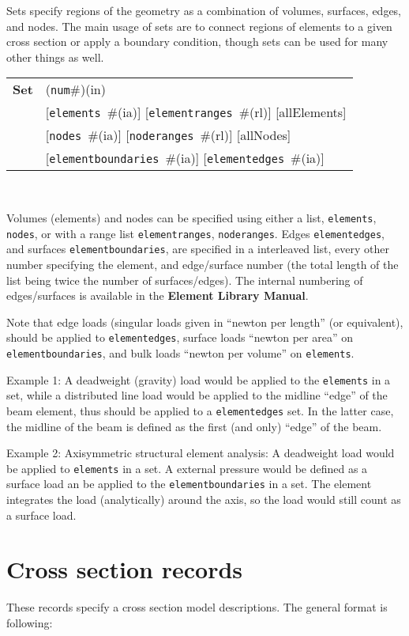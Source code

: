 \documentclass[a4paper]{report}
\newcommand{\param}[1]{\texttt{#1}} %
\newcommand{\optional}[1]{[#1]} %
\newcommand{\field}[2]{\param{#1}~\#{\tiny(#2)}} %
\newcommand{\optField}[2]{\optional{\field{#1}{#2}}}
\newcommand{\componentNum}{(\param{num}\#){\tiny(in)}} %
\newcommand{\entKeywordInst}[1]{\textbf{#1}} %
\newenvironment{record}[1][]{\begin{tabular}{|ll}}{\end{tabular}\\}
\newcommand{\recentry}[2]{{#1}&{#2}\\}
\newcounter{rcc}
\newenvironment{record}[1][\textwidth]{\setcounter{rcc}{0}\rowcolors{1}{lightgray}{lightgray}\tabularx{#1}{llR} \hline}
               {\endtabularx}
\newcommand{\recentry}[2]{\ifthenelse{\value{rcc}>0}{$\backslash$ \\}{\setcounter{rcc}{1}}{#1}&{#2}&}
\begin{document}
Sets specify regions of the geometry as a combination of volumes, surfaces, edges, and nodes.
The main usage of sets are to connect regions of elements to a given cross section or apply a boundary condition, though sets can be used for many other things as well.

\begin{record}[0.9\textwidth]
  \recentry{\entKeywordInst{Set}}{\componentNum}
  \recentry{}{\optField{elements}{ia} \optField{elementranges}{rl} \optional{allElements}}
  \recentry{}{\optField{nodes}{ia} \optField{noderanges}{rl} \optional{allNodes}}
  \recentry{}{\optField{elementboundaries}{ia} \optField{elementedges}{ia}}
\end{record}

Volumes (elements) and nodes can be specified using either a list, \param{elements}, \param{nodes}, or with a range list \param{elementranges}, \param{noderanges}.
Edges \param{elementedges}, and surfaces \param{elementboundaries}, are specified in a interleaved list, every other number specifying the element, and edge/surface number (the total length of the list being twice the number of surfaces/edges).
The internal numbering of edges/surfaces is available in the \textbf{Element Library Manual}.

Note that edge loads (singular loads given in ``newton per length'' (or equivalent), should be applied to \param{elementedges}, surface loads ``newton per area'' on \param{elementboundaries}, and bulk loads ``newton per volume'' on \param{elements}.

Example 1: A deadweight (gravity) load would be applied to the \param{elements} in a set, while a distributed line load would be applied to the midline ``edge'' of the beam element, thus should be applied to a \param{elementedges} set. In the latter case, the midline of the beam is defined as the first (and only) ``edge'' of the beam.

Example 2: Axisymmetric structural element analysis: A deadweight load would be applied to \param{elements} in a set. A external pressure would be defined as a surface load an be applied to the \param{elementboundaries} in a set. The element integrates the load (analytically) around the axis, so the load would still count as a surface load.


\section{Cross section records}
\label{_CrossSectionRecords}
These records specify a cross section model descriptions. The general format is
following:
\end{document}
